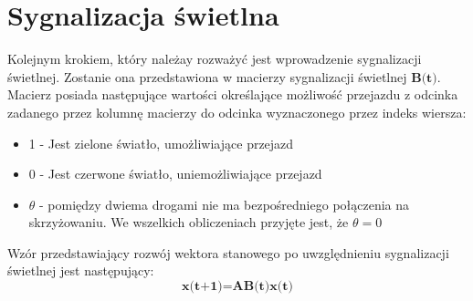 \documentclass[12pt]{book}
\theoremstyle{plain}
\begin{document}
\section{Sygnalizacja świetlna}
Kolejnym krokiem, który należay rozważyć jest wprowadzenie sygnalizacji świetlnej. Zostanie ona przedstawiona w macierzy sygnalizacji świetlnej $\textbf{B(t)}$. Macierz posiada następujące wartości określające możliwość przejazdu z odcinka zadanego przez kolumnę macierzy do odcinka wyznaczonego przez indeks wiersza:
\begin{itemize}
	\item 1 - Jest zielone światło, umożliwiające przejazd
	\item 0 - Jest czerwone światło, uniemożliwiające przejazd
	\item $\theta$ - pomiędzy dwiema drogami nie ma bezpośredniego połączenia na skrzyżowaniu. We wszelkich obliczeniach przyjęte jest, że $\theta=0$
\end{itemize}
Wzór przedstawiający rozwój wektora stanowego po uwzględnieniu sygnalizacji świetlnej jest następujący:
\[
\textbf{x(t+1)}=\textbf{AB(t)x(t)}
\]
\end{document}
